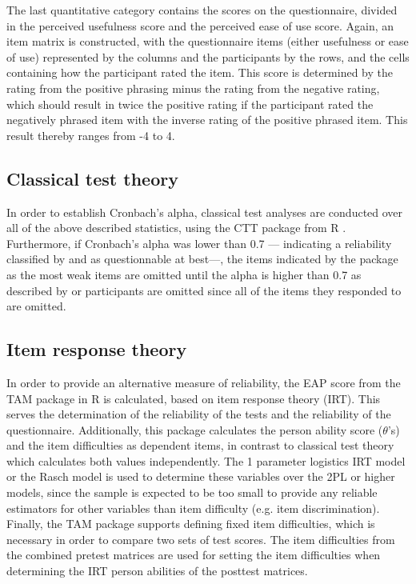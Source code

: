 The last quantitative category contains the scores on the questionnaire, divided in the perceived usefulness score and the perceived ease of use score. Again, an item matrix is constructed, with the questionnaire items (either usefulness or ease of use) represented by the columns and the participants by the rows, and the cells containing how the participant rated the item. This score is determined by the rating from the positive phrasing minus the rating from the negative rating, which should result in twice the positive rating if the participant rated the negatively phrased item with the inverse rating of the positive phrased item. This result thereby ranges from -4 to 4.

\subsection{Classical test theory}

In order to establish Cronbach's alpha, classical test analyses are conducted over all of the above described statistics, using the CTT package from R \cite{ctt}. Furthermore, if Cronbach's alpha was lower than 0.7 --- indicating a reliability classified by  and  as questionnable at best---, the items indicated by the package as the most weak items are omitted until the alpha is higher than 0.7 as described by  or participants are omitted since all of the items they responded to are omitted.

\subsection{Item response theory}

In order to provide an alternative measure of reliability, the EAP score from the TAM package in R \cite{tamr} is calculated, based on item response theory (IRT). This serves the determination of the reliability of the tests and the reliability of the questionnaire. Additionally, this package calculates the person ability score ($\theta$'s) and the item difficulties as dependent items, in contrast to classical test theory which calculates both values independently. The 1 parameter logistics IRT model or the Rasch model is used to determine these variables over the 2PL or higher models, since the sample is expected to be too small to provide any reliable estimators for other variables than item difficulty (e.g. item discrimination). Finally, the TAM package supports defining fixed item difficulties, which is necessary in order to compare two sets of test scores. The item difficulties from the combined pretest matrices are used for setting the item difficulties when determining the IRT person abilities of the posttest matrices.


